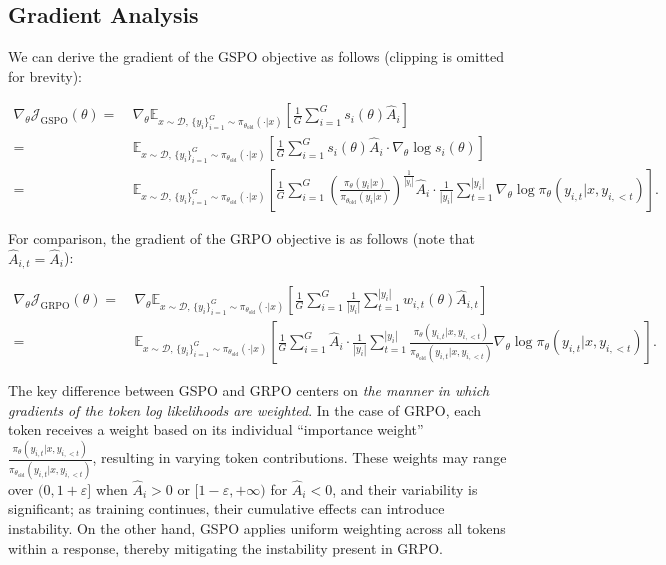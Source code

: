\subsection{Gradient Analysis}
\label{subsec:gradient}

We can derive the gradient of the GSPO objective as follows (clipping is omitted for brevity):

\begin{align}
\nabla_{\theta} \mathcal{J}_\text{GSPO} (\theta)
=&\ 
\nabla_{\theta} \mathbb{E}_{ x \sim \mathcal{D},\, \{y_i\}_{i=1}^G \sim \pi_{\theta_\text{old}}( \cdot | x) }
\left[ 
\frac{1}{G} \sum_{i=1}^{G} s_{i}(\theta) \widehat{A}_{i}
\right] \\
= &\ 
\mathbb{E}_{ x \sim \mathcal{D},\, \{y_i\}_{i=1}^G \sim \pi_{\theta_\text{old}}( \cdot | x) }
\left[ 
\frac{1}{G} \sum_{i=1}^{G}
s_{i}(\theta) \widehat{A}_{i}
\cdot \nabla_{\theta} \log s_{i}(\theta)
\right] \\
=&\ 
\mathbb{E}_{ x \sim \mathcal{D},\, \{y_i\}_{i=1}^G \sim \pi_{\theta_\text{old}}( \cdot | x) }
\left[ 
\frac{1}{G} \sum_{i=1}^{G} 
\left( \frac{ \pi_{\theta} (y_i | x) }{ \pi_{\theta_\text{old}} (y_i | x)} \right)^{\frac{1}{|y_i|}} \widehat{A}_{i} 
\cdot \frac{1}{|y_i|} \sum_{t=1}^{|y_i|} \nabla_{\theta} \log \pi_{\theta} (y_{i,t} | x, y_{i,<t}) 
\right].
\label{equ:gspo_grad}
\end{align}

For comparison, the gradient of the GRPO objective is as follows (note that $\widehat{A}_{i,t} = \widehat{A}_{i}$):

\begin{align}
\nabla_{\theta} \mathcal{J}_\text{GRPO} (\theta) 
=&\ 
\nabla_{\theta} \mathbb{E}_{ x \sim \mathcal{D},\, \{y_i\}_{i=1}^G \sim \pi_{\theta_\text{old}}( \cdot | x) }
\left[ \frac{1}{G} \sum_{i=1}^{G} \frac{1}{|y_i|} \sum_{t=1}^{|y_i|} 
w_{i,t}(\theta) \widehat{A}_{i,t}
\right] \\
=&\
\mathbb{E}_{ x \sim \mathcal{D},\, \{y_i\}_{i=1}^G \sim \pi_{\theta_\text{old}}( \cdot | x) }
\left[ \frac{1}{G} \sum_{i=1}^{G} \widehat{A}_{i} 
\cdot \frac{1}{|y_i|} \sum_{t=1}^{|y_i|} 
\frac{ \pi_{\theta} (y_{i,t} | x, y_{i,<t}) }{ \pi_{\theta_\text{old}} (y_{i,t} | x,y_{i,<t})} 
\nabla_{\theta} \log \pi_{\theta} (y_{i,t} | x, y_{i,<t})  
\right].
\end{align}

The key difference between GSPO and GRPO centers on \textit{the manner in which gradients of the token log likelihoods are weighted}. In the case of GRPO, each token receives a weight based on its individual ``importance weight'' $\frac{ \pi_{\theta} (y_{i,t} | x, y_{i,<t}) }{ \pi_{\theta_\text{old}} (y_{i,t} | x,y_{i,<t})}$, resulting in varying token contributions. These weights may range over $(0, 1+\varepsilon]$ when $\widehat{A}_{i} >0$ or $[1-\varepsilon, +\infty)$ for $\widehat{A}_{i} < 0$, and their variability is significant; as training continues, their cumulative effects can introduce instability. On the other hand, GSPO applies uniform weighting across all tokens within a response, thereby mitigating the instability present in GRPO.

